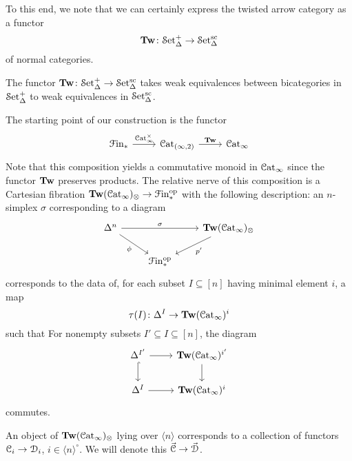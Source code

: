 \documentclass[main.tex]{subfiles}
\begin{document}
To this end, we note that we can certainly express the twisted arrow category as a functor
\begin{equation*}
  \mathbf{Tw}\colon \mathcal{S}\mathrm{et}_{\Delta}^{+} \to \mathcal{S}\mathrm{et}_{\Delta}^{\mathrm{sc}}
\end{equation*}
of normal categories.

\begin{lemma}
  The functor $\mathbf{Tw}\colon \mathcal{S}\mathrm{et}_{\Delta}^{+} \to \mathcal{S}\mathrm{et}_{\Delta}^{\mathrm{sc}}$ takes weak equivalences between bicategories in $\mathcal{S}\mathrm{et}_{\Delta}^{+}$ to weak equivalences in $\mathcal{S}\mathrm{et}_{\Delta}^{\mathrm{sc}}$.
\end{lemma}

The starting point of our construction is the functor
\begin{equation*}
  \begin{tikzcd}
    \Finp
    \arrow[r, "\ICat^{\times}"]
    & \Cat_{(\infty, 2)}
    \arrow[r, "\Tw"]
    & \ICat
  \end{tikzcd}
\end{equation*}
Note that this composition yields a commutative monoid in $\mathcal{C}\mathrm{at}_{\infty}$ since the functor $\mathbf{Tw}$ preserves products. The relative nerve of this composition is a Cartesian fibration $\mathbf{Tw}(\mathcal{C}\mathrm{at}_{\infty})_{\otimes} \to \mathcal{F}\mathrm{in}_{*}^{\mathrm{op}}$ with the following description: an $n$-simplex $\sigma$ corresponding to a diagram
\begin{equation*}
  \begin{tikzcd}
    \Delta^{n}
    \arrow[rr, "\sigma"]
    \arrow[dr, swap, "\phi"]
    && \Tw(\ICat)_{\otimes}
    \arrow[dl, "p'"]
    \\
    & \Finp\op
  \end{tikzcd}
\end{equation*}
corresponds to the data of, for each subset $I \subseteq [n]$ having minimal element $i$, a map
\begin{equation*}
  \tau(I)\colon \Delta^{I} \to \mathbf{Tw}(\mathcal{C}\mathrm{at}_{\infty})^{i}
\end{equation*}
such that For nonempty subsets $I' \subseteq I \subseteq [n]$, the diagram
\begin{equation*}
  \begin{tikzcd}
    \Delta^{I'}
    \arrow[r]
    \arrow[d, hook]
    & \Tw(\ICat)^{i'}
    \arrow[d]
    \\
    \Delta^{I}
    \arrow[r]
    & \Tw(\ICat)^{i}
  \end{tikzcd}
\end{equation*}
commutes.

\begin{example}
  An object of $\mathbf{Tw}(\mathcal{C}\mathrm{at}_{\infty})_{\otimes}$ lying over $\langle n \rangle$ corresponds to a collection of functors $\mathcal{C}_{i} \to \mathcal{D}_{i}$, $i \in \langle n \rangle^{\circ}$. We will denote this $\vec{\mathcal{C}} \to \vec{\mathcal{D}}$.
\end{example}
\end{document}
